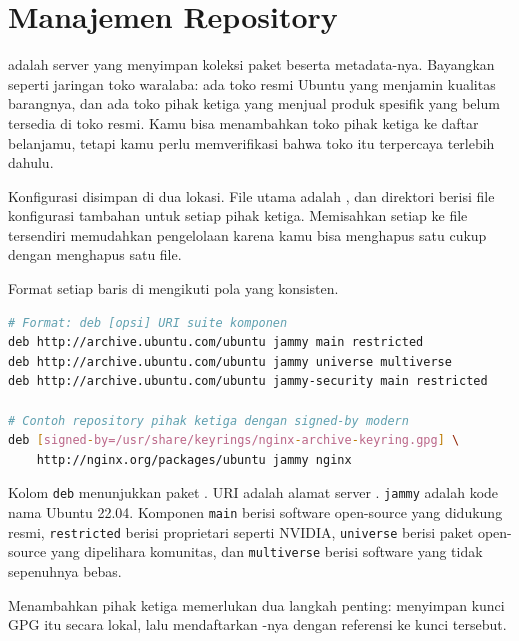 \section{Manajemen Repository}
\label{sec:repository-management}

 adalah server yang menyimpan koleksi paket beserta metadata-nya.
Bayangkan  seperti jaringan toko waralaba: ada toko resmi Ubuntu yang
menjamin kualitas barangnya, dan ada toko pihak ketiga yang menjual produk
spesifik yang belum tersedia di toko resmi. Kamu bisa menambahkan toko pihak
ketiga ke daftar belanjamu, tetapi kamu perlu memverifikasi bahwa toko itu
terpercaya terlebih dahulu.

Konfigurasi  disimpan di dua lokasi. File utama adalah
, dan direktori 
berisi file konfigurasi tambahan untuk setiap  pihak ketiga. Memisahkan
setiap  ke file tersendiri memudahkan pengelolaan karena kamu bisa
menghapus satu  cukup dengan menghapus satu file.

Format setiap baris di  mengikuti pola yang konsisten.

\begin{lstlisting}[language=bash, caption={Format entri sources.list dan contohnya}]
# Format: deb [opsi] URI suite komponen
deb http://archive.ubuntu.com/ubuntu jammy main restricted
deb http://archive.ubuntu.com/ubuntu jammy universe multiverse
deb http://archive.ubuntu.com/ubuntu jammy-security main restricted

# Contoh repository pihak ketiga dengan signed-by modern
deb [signed-by=/usr/share/keyrings/nginx-archive-keyring.gpg] \
    http://nginx.org/packages/ubuntu jammy nginx
\end{lstlisting}

Kolom \texttt{deb} menunjukkan paket . URI adalah alamat server .
\texttt{jammy} adalah kode nama Ubuntu 22.04. Komponen \texttt{main} berisi
software open-source yang didukung resmi, \texttt{restricted} berisi 
proprietari seperti NVIDIA, \texttt{universe} berisi paket open-source yang
dipelihara komunitas, dan \texttt{multiverse} berisi software yang tidak
sepenuhnya bebas.

Menambahkan  pihak ketiga memerlukan dua langkah penting: menyimpan
kunci GPG  itu secara lokal, lalu mendaftarkan \term{repository}-nya dengan
referensi ke kunci tersebut.

